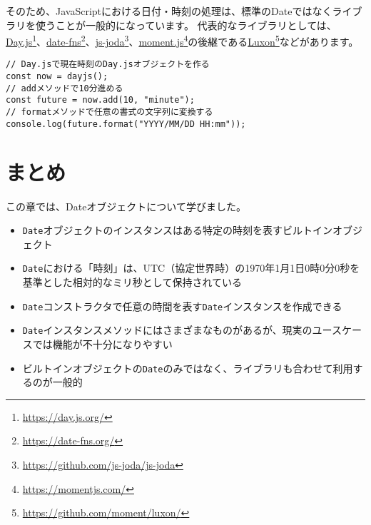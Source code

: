 そのため、JavaScriptにおける日付・時刻の処理は、標準のDateではなくライブラリを使うことが一般的になっています。
代表的なライブラリとしては、\href{https://day.js.org/}{Day.js}\footnote{\url{https://day.js.org/}}、\href{https://date-fns.org/}{date-fns}\footnote{\url{https://date-fns.org/}}、\href{https://github.com/js-joda/js-joda}{js-joda}\footnote{\url{https://github.com/js-joda/js-joda}}、\href{https://momentjs.com/}{moment.js}\footnote{\url{https://momentjs.com/}}の後継である\href{https://github.com/moment/luxon/}{Luxon}\footnote{\url{https://github.com/moment/luxon/}}などがあります。

\begin{lstlisting}
// Day.jsで現在時刻のDay.jsオブジェクトを作る
const now = dayjs();
// addメソッドで10分進める
const future = now.add(10, "minute");
// formatメソッドで任意の書式の文字列に変換する
console.log(future.format("YYYY/MM/DD HH:mm")); 
\end{lstlisting}

\hypertarget{conclusion}{%
\section{まとめ}\label{conclusion}}

この章では、Dateオブジェクトについて学びました。

\begin{itemize}
\item
  \texttt{Date}オブジェクトのインスタンスはある特定の時刻を表すビルトインオブジェクト
\item
  \texttt{Date}における「時刻」は、UTC（協定世界時）の1970年1月1日0時0分0秒を基準とした相対的なミリ秒として保持されている
\item
  \texttt{Date}コンストラクタで任意の時間を表す\texttt{Date}インスタンスを作成できる
\item
  \texttt{Date}インスタンスメソッドにはさまざまなものがあるが、現実のユースケースでは機能が不十分になりやすい
\item
  ビルトインオブジェクトの\texttt{Date}のみではなく、ライブラリも合わせて利用するのが一般的
\end{itemize}

